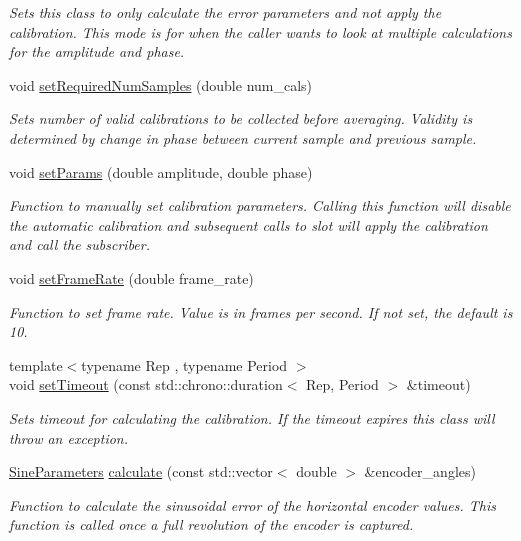\begin{DoxyCompactItemize}
\begin{DoxyCompactList}\small\item\em Sets this class to only calculate the error parameters and not apply the calibration. This mode is for when the caller wants to look at multiple calculations for the amplitude and phase. \end{DoxyCompactList}\item 
void \hyperlink{structquanergy_1_1calibration_1_1EncoderAngleCalibration_aa86be4f4d781cad40afab05f40ad78d6}{set\-Required\-Num\-Samples} (double num\-\_\-cals)
\begin{DoxyCompactList}\small\item\em Sets number of valid calibrations to be collected before averaging. Validity is determined by change in phase between current sample and previous sample. \end{DoxyCompactList}\item 
void \hyperlink{structquanergy_1_1calibration_1_1EncoderAngleCalibration_a0f9d48e2c8ccaf03647dde2666985819}{set\-Params} (double amplitude, double phase)
\begin{DoxyCompactList}\small\item\em Function to manually set calibration parameters. Calling this function will disable the automatic calibration and subsequent calls to slot will apply the calibration and call the subscriber. \end{DoxyCompactList}\item 
void \hyperlink{structquanergy_1_1calibration_1_1EncoderAngleCalibration_a8fe3b279f9dbed5e17e91bbe4271943d}{set\-Frame\-Rate} (double frame\-\_\-rate)
\begin{DoxyCompactList}\small\item\em Function to set frame rate. Value is in frames per second. If not set, the default is 10. \end{DoxyCompactList}\item 
{\footnotesize template$<$typename Rep , typename Period $>$ }\\void \hyperlink{structquanergy_1_1calibration_1_1EncoderAngleCalibration_a478a432ee011bab690954869f8638ce1}{set\-Timeout} (const std\-::chrono\-::duration$<$ Rep, Period $>$ \&timeout)
\begin{DoxyCompactList}\small\item\em Sets timeout for calculating the calibration. If the timeout expires this class will throw an exception. \end{DoxyCompactList}\item 
\hyperlink{structquanergy_1_1calibration_1_1EncoderAngleCalibration_a989e77cbef9730169908a437323a96c2}{Sine\-Parameters} \hyperlink{structquanergy_1_1calibration_1_1EncoderAngleCalibration_a2c4dc14bab7cad0d55e9466e044424a2}{calculate} (const std\-::vector$<$ double $>$ \&encoder\-\_\-angles)
\begin{DoxyCompactList}\small\item\em Function to calculate the sinusoidal error of the horizontal encoder values. This function is called once a full revolution of the encoder is captured. \end{DoxyCompactList}\end{DoxyCompactItemize}
